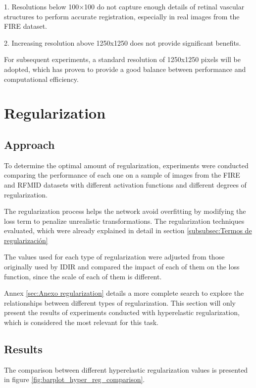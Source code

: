 1. Resolutions below 100×100 do not capture enough details of retinal vascular structures to perform accurate registration, especially in real images from the FIRE dataset.

2. Increasing resolution above 1250x1250 does not provide significant benefits.

For subsequent experiments, a standard resolution of 1250x1250 pixels will be adopted, which has proven to provide a good balance between performance and computational efficiency.

\section{Regularization}
\label{sec:Regularización}

\subsection{Approach}
\label{subsec:Planteamento-regularization}

To determine the optimal amount of regularization, experiments were conducted comparing the performance of each one on a sample of images from the FIRE and RFMID datasets with different activation functions and different degrees of regularization.

The regularization process helps the network avoid overfitting by modifying the loss term to penalize unrealistic transformations.
The regularization techniques evaluated, which were already explained in detail in section \ref{subsubsec:Termos de regularización}

The values used for each type of regularization were adjusted from those originally used by IDIR and compared the impact of each of them on the loss function, since the scale of each of them is different.

Annex \ref{sec:Anexo regularization} details a more complete search to explore the relationships between different types of regularization.
This section will only present the results of experiments conducted with hyperelastic regularization, which is considered the most relevant for this task.

\subsection{Results}
\label{subsec:Resultados-regularization}

The comparison between different hyperelastic regularization values is presented in figure \ref{fig:barplot_hyper_reg_comparison}.

